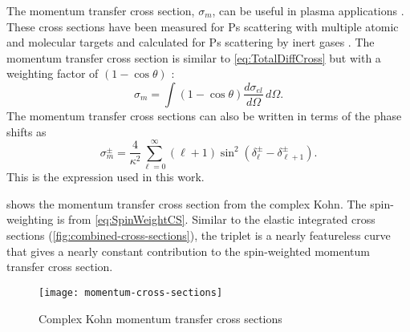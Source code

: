 \documentclass[Dissertation.tex]{subfiles}
\begin{document}

The momentum transfer cross section, $\sigma_m$, can be useful in plasma applications
\cite{Wang2014, McEachran2014}. These cross sections have been measured for Ps
scattering with multiple atomic and molecular targets
\cite{Nagashima1998,Saito2003,Skalsey1998} and calculated
for Ps scattering by inert gases \cite{Blackwood2002c}. 
The momentum transfer cross section is
similar to \cref{eq:TotalDiffCross} but with a weighting factor of
$(1 - \cos\theta)$ \cite{Walters2004}:
\begin{equation}
\label{eq:MomentumCrossInt}
\sigma_m = \int (1 - \cos\theta) \frac{d\sigma_{el}}{d\Omega} \, d\Omega.
\end{equation}
The momentum transfer cross sections can also be written in terms of the
phase shifts as \citep[p. 589]{Bransden2003}
\begin{equation}
\label{eq:MomentumCross}
\sigma_{m}^\pm = \frac{4}{\kappa^2} \sum_{\ell=0}^\infty (\ell+1) \sin^2 (\delta_\ell^\pm - \delta_{\ell+1}^\pm) .
\end{equation}
This is the expression used in this work.


 shows the momentum transfer cross section 
from the complex Kohn. The spin-weighting is from \cref{eq:SpinWeightCS}.
Similar to the elastic integrated cross sections (\cref{fig:combined-cross-sections}),
the triplet is a nearly featureless curve that gives a nearly constant
contribution to the spin-weighted momentum transfer cross section.

\begin{figure}
	\centering
	\texttt{[image: momentum-cross-sections]}
	\caption[Momentum transfer cross sections]{Complex Kohn momentum transfer cross sections}
	\label{fig:momentum-cross-sections}
\end{figure}
\end{document}
